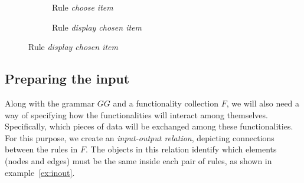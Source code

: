 \begin{example}
\begin{figure}[!]
\ContinuedFloat
\centering
  \begin{subfigure}[t]{.5\textwidth}
    \centerline{}
    \caption{Rule \emph{choose item}}
  \end{subfigure}

  \begin{subfigure}[t]{.5\textwidth}
    \centerline{}
    \caption{Rule \emph{display chosen item}}
  \end{subfigure}
\end{figure}
\end{example}


\subsection{Preparing the input}

Along with the grammar $GG$ and a functionality collection $F$, we will also need a way of specifying how the functionalities will interact among themselves. Specifically, which pieces of data will be exchanged among these functionalities. For this purpose, we create an \emph{input-output relation}, depicting connections between the rules in $F$. The objects in this relation identify which elements (nodes and edges) must be the same inside each pair of rules, as shown in example~\ref{ex:inout}.

